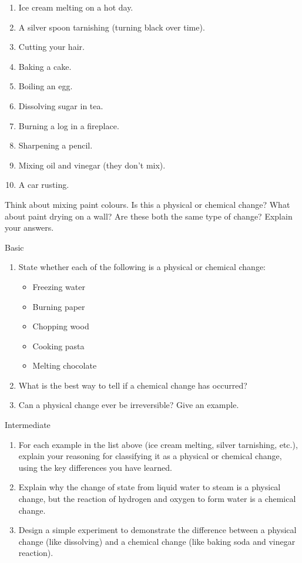 \begin{enumerate}
    \item  Ice cream melting on a hot day.
    \item  A silver spoon tarnishing (turning black over time).
    \item  Cutting your hair.
    \item  Baking a cake.
    \item  Boiling an egg.
    \item  Dissolving sugar in tea.
    \item  Burning a log in a fireplace.
    \item  Sharpening a pencil.
    \item  Mixing oil and vinegar (they don't mix).
    \item  A car rusting.
\end{enumerate}

\begin{stopandthink}
Think about mixing paint colours. Is this a physical or chemical change? What about paint drying on a wall? Are these both the same type of change? Explain your answers.
\end{stopandthink}


\begin{tieredquestions}{Basic}
\begin{enumerate}
    \item  State whether each of the following is a physical or chemical change:
        \begin{itemize}
            \item  Freezing water
            \item  Burning paper
            \item  Chopping wood
            \item  Cooking pasta
            \item  Melting chocolate
        \end{itemize}
    \item  What is the best way to tell if a chemical change has occurred?
    \item  Can a physical change ever be irreversible? Give an example.
\end{enumerate}
\end{tieredquestions}

\begin{tieredquestions}{Intermediate}
\begin{enumerate}
    \item  For each example in the list above (ice cream melting, silver tarnishing, etc.), explain your reasoning for classifying it as a physical or chemical change, using the key differences you have learned.
    \item  Explain why the change of state from liquid water to steam is a physical change, but the reaction of hydrogen and oxygen to form water is a chemical change.
    \item  Design a simple experiment to demonstrate the difference between a physical change (like dissolving) and a chemical change (like baking soda and vinegar reaction).
\end{enumerate}
\end{tieredquestions}

